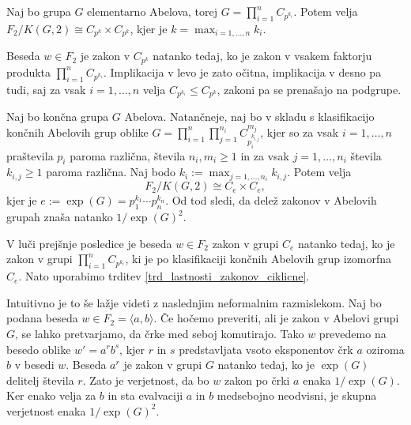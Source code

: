\begin{posledica}
\label{psl_lastnosti_zakonov_elementarno_abelove}
Naj bo grupa $G$ elementarno Abelova, torej $G = \prod_{i = 1}^{n} C_{p^{k_{i}}}$. Potem velja $F_2 / K(G, 2) \cong C_{p^{k}} \times C_{p^{k}}$, kjer je $k = \max_{i = 1 , \ldots , n} k_i$.
\end{posledica}
\begin{dokaz}
 Beseda $w \in F_2$ je zakon v $C_{p^{k}}$ natanko tedaj, ko je zakon v vsakem faktorju produkta $\prod_{i = 1}^{n} C_{p^{k_{i}}}$. Implikacija v levo je zato očitna, implikacija v desno pa tudi,
saj za vsak $i = 1 , \ldots , n$ velja $C_{p^{k_{i}}} \le C_{p^{k}}$, zakoni pa se prenašajo na podgrupe.
\end{dokaz}

\begin{posledica}
\label{psl_lastnosti_zakonov_splosni_produkti_ciklicnih}
Naj bo končna grupa $G$ Abelova. Natančneje, naj bo v skladu s klasifikacijo končnih Abelovih grup oblike $G = \prod_{i = 1}^{n} \prod_{j = 1}^{n_i} C_{p_{i}^{k_{i,j}}}^{m_j}$, kjer so za vsak $i = 1, \ldots, n$ praštevila $p_i$ paroma različna, števila $n_i, m_{i} \ge 1$ in za vsak $j = 1, \ldots , n_i$ števila $k_{i, j} \ge 1$ paroma različna.
Naj bodo $k_i := \max_{j = 1, \ldots, n_i} k_{i,j}$. Potem velja $$F_2 / K(G, 2) \cong C_{e} \times C_{e},$$ kjer je $e := \exp(G) = p_1^{k_1} \cdots  p_n^{k_n}$.
Od tod sledi, da delež zakonov v Abelovih grupah znaša natanko $1 / \exp(G)^2$.
\end{posledica}
\begin{dokaz}
V luči prejšnje posledice je beseda $w \in F_2$ zakon v grupi $C_e$ natanko tedaj, ko je zakon v grupi $\prod_{i = 1}^{n} C_{p^{k_i}}$, ki je po klasifikaciji končnih Abelovih grup izomorfna $C_e$.
Nato uporabimo trditev \ref{trd_lastnosti_zakonov_ciklicne}.
\end{dokaz}
Intuitivno je to še lažje videti z naslednjim neformalnim razmislekom.
Naj bo podana beseda $w \in F_2 = \langle a, b \rangle$. Če hočemo preveriti, ali je zakon v Abelovi grupi $G$, se lahko pretvarjamo, da črke med seboj komutirajo. Tako $w$ prevedemo na besedo oblike $w' = a^r b^s$,
kjer $r$ in $s$ predstavljata vsoto eksponentov črk $a$ oziroma $b$ v besedi $w$. Beseda $a^r$ je zakon v grupi $G$ natanko tedaj, ko je $\exp(G)$ delitelj števila $r$. Zato je verjetnost, da bo $w$ zakon po črki $a$ enaka $1 / \exp(G)$. %
Ker enako velja za $b$ in sta evalvaciji $a$ in $b$ medsebojno neodvisni, je skupna verjetnost enaka $1 / \exp(G)^2$.

